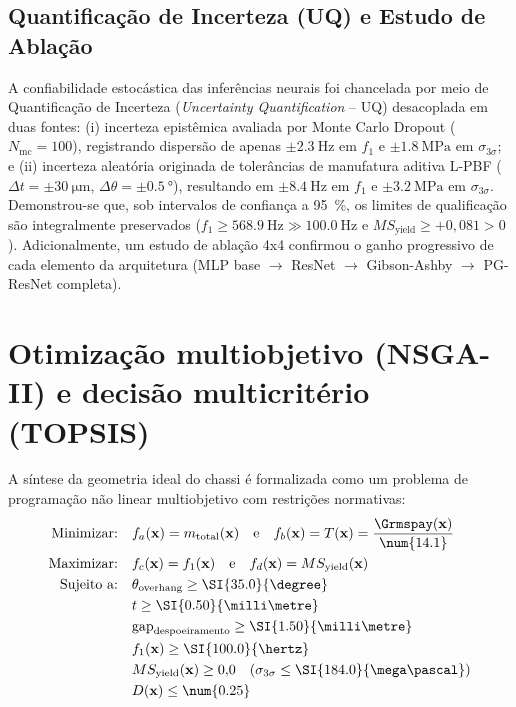 \subsection{Quantificação de Incerteza (UQ) e Estudo de Ablação}
A confiabilidade estocástica das inferências neurais foi chancelada por meio de Quantificação de Incerteza (\textit{Uncertainty Quantification} -- UQ) desacoplada em duas fontes: (i) incerteza epistêmica avaliada por Monte Carlo Dropout ($N_{\text{mc}} = 100$), registrando dispersão de apenas $\pm \SI{2.3}{\hertz}$ em $f_1$ e $\pm \SI{1.8}{\mega\pascal}$ em $\sigma_{3\sigma}$; e (ii) incerteza aleatória originada de tolerâncias de manufatura aditiva L-PBF ($\Delta t = \pm \SI{30}{\micro\metre}$, $\Delta \theta = \pm \SI{0.5}{\degree}$), resultando em $\pm \SI{8.4}{\hertz}$ em $f_1$ e $\pm \SI{3.2}{\mega\pascal}$ em $\sigma_{3\sigma}$. Demonstrou-se que, sob intervalos de confiança a \SI{95}{\percent}, os limites de qualificação são integralmente preservados ($f_1 \ge \SI{568.9}{\hertz} \gg \SI{100.0}{\hertz}$ e $MS_{\text{yield}} \ge +0{,}081 > 0$). Adicionalmente, um estudo de ablação 4x4 confirmou o ganho progressivo de cada elemento da arquitetura (MLP base $\to$ ResNet $\to$ Gibson-Ashby $\to$ PG-ResNet completa).

\section{Otimização multiobjetivo (NSGA-II) e decisão multicritério (TOPSIS)}
\label{sec:metod-otimizacao}

A síntese da geometria ideal do chassi é formalizada como um problema de programação não linear multiobjetivo com restrições normativas:
\begin{equation}
  \begin{aligned}
    \text{Minimizar:} \quad & f_a(\mathbf{x}) = m_{\text{total}}(\mathbf{x}) \quad \text{e} \quad f_b(\mathbf{x}) = T(\mathbf{x}) = \frac{\Grmspay(\mathbf{x})}{\num{14.1}} \\
    \text{Maximizar:} \quad & f_c(\mathbf{x}) = f_1(\mathbf{x}) \quad \text{e} \quad f_d(\mathbf{x}) = MS_{\text{yield}}(\mathbf{x}) \\
    \text{Sujeito a:} \quad & \theta_{\text{overhang}} \ge \SI{35.0}{\degree} \\
    & t \ge \SI{0.50}{\milli\metre} \\
    & \text{gap}_{\text{despoeiramento}} \ge \SI{1.50}{\milli\metre} \\
    & f_1(\mathbf{x}) \ge \SI{100.0}{\hertz} \\
    & MS_{\text{yield}}(\mathbf{x}) \ge 0{,}0 \quad (\sigma_{3\sigma} \le \SI{184.0}{\mega\pascal}) \\
    & D(\mathbf{x}) \le \num{0.25}
  \end{aligned}
  \label{eq:problema-otimizacao}
\end{equation}

